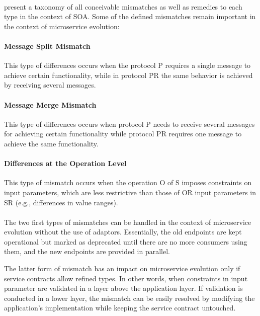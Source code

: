 \paragraph{}

\citeauthor{adaptersWebServices} \cite{adaptersWebServices} present a taxonomy of all conceivable mismatches as well as remedies to each type in the context of SOA.
Some of the defined mismatches remain important in the context of microservice evolution:

\paragraph{Message Split Mismatch}
This type of differences occurs when the protocol P requires a single message to achieve certain functionality,
while in protocol PR the same behavior is achieved by receiving several messages.

\paragraph{Message Merge Mismatch}
This type of differences occurs when protocol P needs to receive several messages for achieving certain
functionality while protocol PR requires one message to achieve the same functionality.

\paragraph{Differences at the Operation Level}
This type of mismatch occurs when the operation O of S imposes constraints on input parameters,
which are less restrictive than those of OR input parameters in SR (e.g., differences in value ranges).

\paragraph{}

The two first types of mismatches can be handled in the context of microservice evolution without the use of adaptors.
Essentially, the old endpoints are kept operational but marked as deprecated until there are no more consumers using them, and the new endpoints are provided in parallel.

The latter form of mismatch has an impact on microservice evolution only if service contracts allow refined types.
In other words, when constraints in input parameter are validated in a layer above the application layer.
If validation is conducted in a lower layer, the mismatch can be easily resolved by modifying the application's implementation while keeping the service contract untouched.

